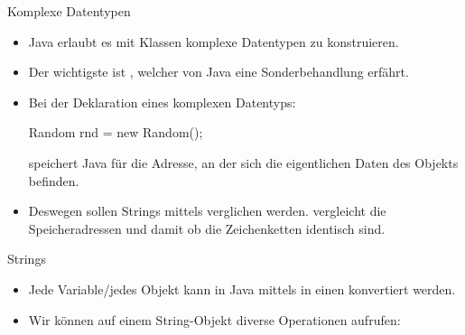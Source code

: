 \begin{frame}[fragile]{Komplexe Datentypen}
    \begin{itemize}[<+(1)->]
        \widei
        \item Java erlaubt es mit Klassen komplexe Datentypen zu konstruieren.
        \item Der wichtigste ist ,\pause{} welcher von Java eine Sonderbehandlung erfährt.
        \item Bei der Deklaration eines komplexen Datentyps:\pause{}
\begin{plainjava}
Random rnd = new Random();
\end{plainjava}
        \pause{}speichert Java für  die Adresse,\pause{} an der sich die eigentlichen Daten des Objekts befinden.
        \item Deswegen sollen Strings mittels  verglichen werden.\pause{} \bjava{==} vergleicht die Speicheradressen\pause{} und damit ob die Zeichenketten identisch sind.
    \end{itemize}
\end{frame}

\begin{frame}{Strings}
    \begin{itemize}[<+(1)->]
        \widei
        \item Jede Variable/jedes Objekt kann in Java mittels  in einen  konvertiert werden.
        \item Wir können auf einem String-Objekt diverse Operationen aufrufen: 
    \end{itemize}
\end{frame}


